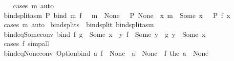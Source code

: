 \begin{isabellebody}
%
\isadelimproof
\ \ %
\endisadelimproof
%
\isatagproof
{}\isamarkupfalse%
\ {\isacharparenleft}{\kern0pt}cases\ m{\isacharparenright}{\kern0pt}\ auto%
\endisatagproof
{\isafoldproof}%
%
\isadelimproof
\isanewline
%
\endisadelimproof
\isanewline
{}\isamarkupfalse%
\ bind{\isacharunderscore}{\kern0pt}split{\isacharunderscore}{\kern0pt}asm{\isacharcolon}{\kern0pt}\ {\isachardoublequoteopen}P\ {\isacharparenleft}{\kern0pt}bind\ m\ f{\isacharparenright}{\kern0pt}\ {\isasymlongleftrightarrow}\ {\isasymnot}\ {\isacharparenleft}{\kern0pt}m\ {\isacharequal}{\kern0pt}\ None\ {\isasymand}\ {\isasymnot}\ P\ None\ {\isasymor}\ {\isacharparenleft}{\kern0pt}{\isasymexists}x{\isachardot}{\kern0pt}\ m\ {\isacharequal}{\kern0pt}\ Some\ x\ {\isasymand}\ {\isasymnot}\ P\ {\isacharparenleft}{\kern0pt}f\ x{\isacharparenright}{\kern0pt}{\isacharparenright}{\kern0pt}{\isacharparenright}{\kern0pt}{\isachardoublequoteclose}\isanewline
%
\isadelimproof
\ \ %
\endisadelimproof
%
\isatagproof
{}\isamarkupfalse%
\ {\isacharparenleft}{\kern0pt}cases\ m{\isacharparenright}{\kern0pt}\ auto%
\endisatagproof
{\isafoldproof}%
%
\isadelimproof
\isanewline
%
\endisadelimproof
\isanewline
{}\isamarkupfalse%
\ bind{\isacharunderscore}{\kern0pt}splits\ {\isacharequal}{\kern0pt}\ bind{\isacharunderscore}{\kern0pt}split\ bind{\isacharunderscore}{\kern0pt}split{\isacharunderscore}{\kern0pt}asm\isanewline
\isanewline
{}\isamarkupfalse%
\ bind{\isacharunderscore}{\kern0pt}eq{\isacharunderscore}{\kern0pt}Some{\isacharunderscore}{\kern0pt}conv{\isacharcolon}{\kern0pt}\ {\isachardoublequoteopen}bind\ f\ g\ {\isacharequal}{\kern0pt}\ Some\ x\ {\isasymlongleftrightarrow}\ {\isacharparenleft}{\kern0pt}{\isasymexists}y{\isachardot}{\kern0pt}\ f\ {\isacharequal}{\kern0pt}\ Some\ y\ {\isasymand}\ g\ y\ {\isacharequal}{\kern0pt}\ Some\ x{\isacharparenright}{\kern0pt}{\isachardoublequoteclose}\isanewline
%
\isadelimproof
\ \ %
\endisadelimproof
%
\isatagproof
{}\isamarkupfalse%
\ {\isacharparenleft}{\kern0pt}cases\ f{\isacharparenright}{\kern0pt}\ simp{\isacharunderscore}{\kern0pt}all%
\endisatagproof
{\isafoldproof}%
%
\isadelimproof
\isanewline
%
\endisadelimproof
\isanewline
{}\isamarkupfalse%
\ bind{\isacharunderscore}{\kern0pt}eq{\isacharunderscore}{\kern0pt}None{\isacharunderscore}{\kern0pt}conv{\isacharcolon}{\kern0pt}\ {\isachardoublequoteopen}Option{\isachardot}{\kern0pt}bind\ a\ f\ {\isacharequal}{\kern0pt}\ None\ {\isasymlongleftrightarrow}\ a\ {\isacharequal}{\kern0pt}\ None\ {\isasymor}\ f\ {\isacharparenleft}{\kern0pt}the\ a{\isacharparenright}{\kern0pt}\ {\isacharequal}{\kern0pt}\ None{\isachardoublequoteclose}\isanewline

\end{isabellebody}
